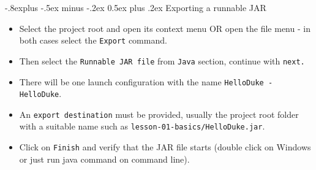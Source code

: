 \documentclass[10pt,landscape,a4paper]{article}
\makeatletter
\renewcommand{\subsection}{\@startsection{subsection}{2}{0mm}%
                                {-.8explus -.5ex minus -.2ex}%
                                {0.5ex plus .2ex}%
                                {\normalfont\normalsize\bfseries}}
\makeatother
\begin{document}
\begin{multicols}{2}
\subsection{Exporting a runnable JAR}
\begin{itemize}
\item Select the project root and open its context menu OR open the file menu - in both cases select the \texttt{Export} command.
\item Then select the \texttt{Runnable JAR file} from \texttt{Java} section, continue with \texttt{next.}
\item There will be one launch configuration with the name \texttt{HelloDuke - HelloDuke}.
\item An \texttt{export destination} must be provided, usually the project root folder with a suitable name such as \texttt{lesson-01-basics/HelloDuke.jar}.
\item Click on \texttt{Finish} and verify that the JAR file starts (double click on Windows or just run java command on command line).
\end{itemize}
\end{multicols}
\end{document}
